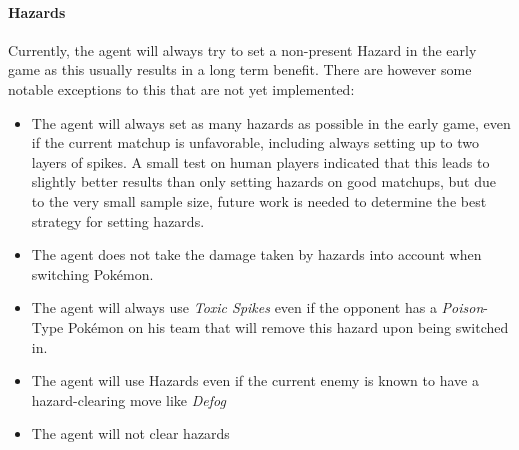 \paragraph{Hazards}
Currently, the agent will always try to set a non-present Hazard in the early game as this usually 
results in a long term benefit. There are however some notable exceptions to this that 
are not yet implemented:
\begin{itemize}
  \item The agent will always set as many hazards as possible in the early game, even if the current matchup 
  is unfavorable, including always setting up to two layers of spikes. A small test on human players indicated
  that this leads to slightly better results than only setting hazards on good matchups, but due to the very
  small sample size, future work is needed to determine the best strategy for setting hazards.
  \item The agent does not take the damage taken by hazards into account when switching Pokémon. 
  \item The agent will always use \textit{Toxic Spikes} even if the opponent has a \textit{Poison}-Type
  Pokémon on his team that will remove this hazard upon being switched in.
  \item The agent will use Hazards even if the current enemy is known to have a hazard-clearing move like
  \textit{Defog}~\autocite{Bulbapedia:Defog}
  \item The agent will not clear hazards
\end{itemize}

